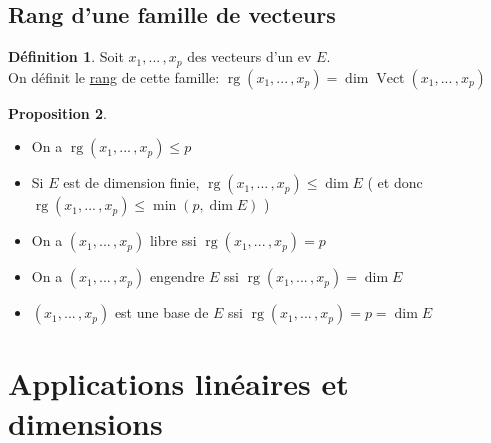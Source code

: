 \documentclass[10pt,a4paper]{article}
\theoremstyle{definition}
\newtheorem{proposition}{Proposition}[section]
\newtheorem{definition}[proposition]{Définition}
\DeclareMathOperator{\vect}{Vect}
\DeclareMathOperator{\rg}{rg}
\begin{document}
\subsection{Rang d'une famille de vecteurs}
\begin{definition}
Soit $x_1, ...\, , x_p$ des vecteurs d'un ev $E$. \\
On définit le \uline{rang} de cette famille: $\rg (x_1, ...\, , x_p) = \dim \vect (x_1, ...\, , x_p)$
\end{definition}
\begin{proposition}
\hfill
\begin{itemize}
\item On a $\rg (x_1, ...\, , x_p) \leq p$
\item Si $E$ est de dimension finie, $\rg (x_1, ...\, , x_p) \leq \dim E$ ( et donc $\rg (x_1, ...\, , x_p) \leq \min (p, \dim E)$ )
\item On a $(x_1, ...\, , x_p)$ libre ssi $\rg (x_1, ...\, , x_p) = p$
\item On a $(x_1, ...\, , x_p)$ engendre $E$ ssi $\rg (x_1, ...\, , x_p) = \dim E$
\item $(x_1, ...\, , x_p)$ est une base de $E$ ssi $\rg (x_1, ...\, , x_p) = p = \dim E$
\end{itemize}
\end{proposition}

\section{Applications linéaires et dimensions}
\end{document}
